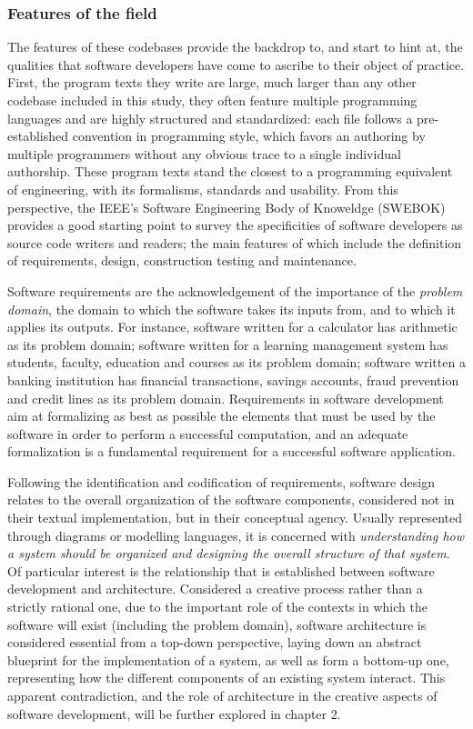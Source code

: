 \subsubsection{Features of the field}

The features of these codebases provide the backdrop to, and start to hint at, the qualities that software developers have come to ascribe to their object of practice. First, the program texts they write are large, much larger than any other codebase included in this study, they often feature multiple programming languages and are highly structured and standardized: each file follows a pre-established convention in programming style, which favors an authoring by multiple programmers without any obvious trace to a single individual authorship. These program texts stand the closest to a programming equivalent of engineering, with its formalisms, standards and usability. From this perspective, the IEEE's Software Engineering Body of Knoweldge (SWEBOK) provides a good starting point to survey the specificities of software developers as source code writers and readers\cite{bourque_swebok_2014}; the main features of which include the definition of requirements, design, construction testing and maintenance.

Software requirements are the acknowledgement of the importance of the \emph{problem domain}, the domain to which the software takes its inputs from, and to which it applies its outputs. For instance, software written for a calculator has arithmetic as its problem domain; software written for a learning management system has students, faculty, education and courses as its problem domain; software written a banking institution has financial transactions, savings accounts, fraud prevention and credit lines as its problem domain. Requirements in software development aim at formalizing as best as possible the elements that must be used by the software in order to perform a successful computation, and an adequate formalization is a fundamental requirement for a successful software application.

Following the identification and codification of requirements, software design relates to the overall organization of the software components, considered not in their textual implementation, but in their conceptual agency. Usually represented through diagrams or modelling languages, it is concerned with \emph{understanding how a system should be
  organized and designing the overall structure of that system}\cite{sommerville_software_2010}. Of particular interest is the relationship that is established between software development and architecture. Considered a creative process rather than a strictly rational one, due to the important role of the contexts in which the software will exist (including the problem domain)\cite{sommerville_software_2010}, software architecture is considered essential from a top-down perspective, laying down an abstract blueprint for the implementation of a system, as well as form a bottom-up one, representing how the different components of an existing system interact. This apparent contradiction, and the role of architecture in the creative aspects of software development, will be further explored in chapter 2.

